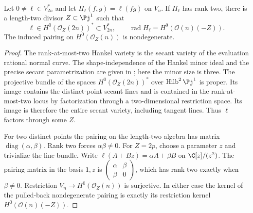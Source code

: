 \begin{lemma}
\label{lem:hyperplane-confluent-radical}
Let $0\ne\ell\in V_{2n}^*$ and let
$H_\ell(f,g)=\ell(fg)$ on $V_n$. If $H_\ell$ has rank two,
there is a length-two divisor $Z\subset\Pj^1$ such that
\[
 \ell\in H^0(\mathcal O_Z(2n))^*\subset V_{2n}^*,\qquad
 \operatorname{rad}H_\ell=H^0(\mathcal O(n)(-Z)).
\]
The induced pairing on $H^0(\mathcal O_Z(n))$ is nondegenerate.
\end{lemma}
\begin{proof}
The rank-at-most-two Hankel variety is the secant variety of the
evaluation rational normal curve. The shape-independence of the
Hankel minor ideal and the precise secant parametrization are given
in \cite[Section 1 and Section 2, equation (2.0.1)]{CMSV}; here the
minor size is three. The projective bundle of the spaces
$H^0(\mathcal O_Z(2n))^*$ over $\operatorname{Hilb}^2\Pj^1$ is
proper. Its image contains the distinct-point secant lines and is
contained in the rank-at-most-two locus by factorization through a
two-dimensional restriction space. Its image is therefore the
entire secant variety, including tangent lines. Thus $\ell$
factors through some $Z$.

For two distinct points the pairing on the length-two algebra has
matrix $\operatorname{diag}(\alpha,\beta)$. Rank two forces
$\alpha\beta\ne0$. For $Z=2p$, choose a parameter $z$ and
trivialize the line bundle. Write
$\ell(A+Bz)=\alpha A+\beta B$ on $\C[z]/(z^2)$. The pairing
matrix in the basis $1,z$ is
$\left(\begin{smallmatrix}\alpha&\beta\\\beta&0\end{smallmatrix}\right)$,
which has rank two exactly when $\beta\ne0$. Restriction
$V_n\to H^0(\mathcal O_Z(n))$ is surjective. In either case the
kernel of the pulled-back nondegenerate pairing is exactly its
restriction kernel $H^0(\mathcal O(n)(-Z))$.
\end{proof}

